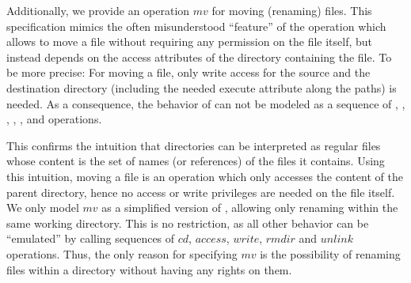 Additionally, we provide an operation $mv$ for moving (renaming) files.  This
specification mimics the often misunderstood ``feature'' of the \susv{}
 operation which allows to move a file without requiring any
permission on the file itself, but instead depends on the access attributes of
the directory containing the file.  To be more precise: For moving a file, only
write access for the source and the destination directory (including the needed
execute attribute along the paths) is needed.  As a consequence, the behavior of
 can not be modeled as a sequence of ,
, , , , and
 operations.

This confirms the intuition that directories can be interpreted as regular files
whose content is the set of names (or references) of the files it contains.
Using this intuition, moving a file is an operation which only accesses the
content of the parent directory, hence no access or write privileges are needed
on the file itself. We only model $mv$ as a simplified version of
, allowing only renaming within the same working directory. This
is no restriction, as all other behavior can be ``emulated'' by calling
sequences of $cd$, $access$, $write$, $rmdir$ and $unlink$ operations.  Thus,
the only reason for specifying $mv$ is the possibility of renaming files within
a directory without having any rights on them.

